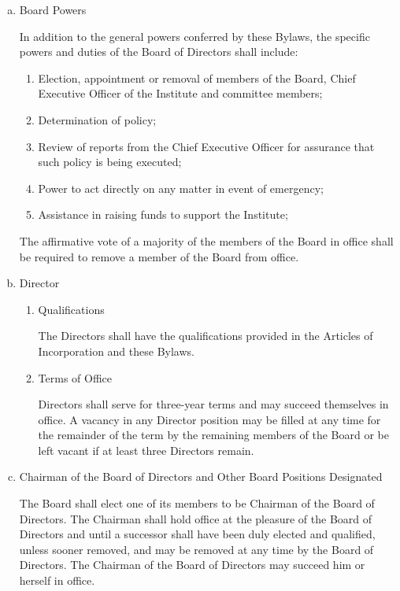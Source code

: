 \begin{enumerate}[(a)]
\item Board Powers

In addition to the general powers conferred by these Bylaws, the specific powers and duties of the Board of Directors shall include:

\begin{enumerate}
\item Election, appointment or removal of members of the Board, Chief Executive Officer of the Institute and committee members; 
\item Determination of policy;
\item Review of reports from the Chief Executive Officer for assurance that such policy is being executed;
\item Power to act directly on any matter in event of emergency;
\item Assistance in raising funds to support the Institute;
\end{enumerate}

The affirmative vote of a majority of the members of the Board in office shall be required to remove a member of the Board from office.

\item Director

\begin{enumerate}
\item Qualifications

The Directors shall have the qualifications provided in the Articles of Incorporation and these Bylaws. 

\item Terms of Office

Directors shall serve for three-year terms and may succeed themselves in office.  A vacancy in any Director position may be filled at any time for the remainder of the term by the remaining members of the Board or be left vacant if at least three Directors remain.

\end{enumerate}

\item Chairman of the Board of Directors and Other Board Positions Designated

The Board shall elect one of its members to be Chairman of the Board of Directors. The Chairman shall hold office at the pleasure of the Board of Directors and until a successor shall have been duly elected and qualified, unless sooner removed, and may be removed at any time by the Board of Directors. The Chairman of the Board of Directors may succeed him or herself in office.

\end{enumerate}

